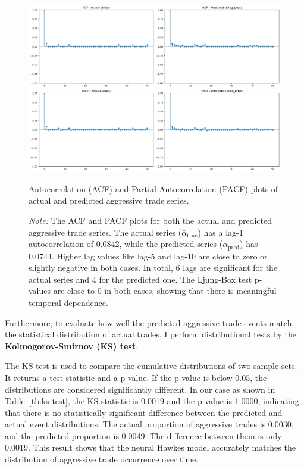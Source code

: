 
\begin{figure}[tbp]
    \centering
    \includegraphics[width=0.95\linewidth]{figures/ACF_181330.png}
    \caption{Autocorrelation (ACF) and Partial Autocorrelation (PACF) plots of actual and predicted aggressive trade series.}
    \caption*{\textit{Note:} The ACF and PACF plots for both the actual and predicted aggressive trade series. The actual series ($\bar{\alpha}_\text{true}$) has a lag-1 autocorrelation of 0.0842, while the predicted series ($\bar{\alpha}_\text{pred}$) has 0.0744. Higher lag values like lag-5 and lag-10 are close to zero or slightly negative in both cases. In total, 6 lags are significant for the actual series and 4 for the predicted one. The Ljung-Box test p-values are close to 0 in both cases, showing that there is meaningful temporal dependence.}
    \label{fig:acf-pacf}
\end{figure}



Furthermore, to evaluate how well the predicted aggressive trade events match the statistical distribution of actual trades, I perform distributional tests by the \textbf{Kolmogorov-Smirnov (KS) test}. 

The KS test is used to compare the cumulative distributions of two sample sets. It returns a test statistic and a p-value. If the p-value is below 0.05, the distributions are considered significantly different. In our case as shown in Table~\ref{tb:ks-test}, the KS statistic is 0.0019 and the p-value is 1.0000, indicating that there is no statistically significant difference between the predicted and actual event distributions. The actual proportion of aggressive trades is 0.0030, and the predicted proportion is 0.0049. The difference between them is only 0.0019. This result shows that the neural Hawkes model accurately matches the distribution of aggressive trade occurrence over time.

